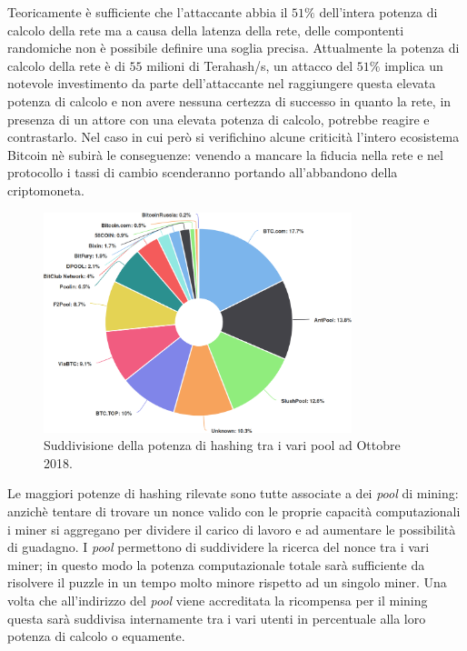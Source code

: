 Teoricamente è sufficiente che l'attaccante abbia il $51\%$ dell'intera potenza di calcolo della rete ma a causa della latenza della rete, delle compontenti randomiche non è possibile definire una soglia precisa.\newline
Attualmente la potenza di calcolo della rete è di $55$ milioni di Terahash/s, un attacco del $51\%$ implica un notevole investimento da parte dell'attaccante nel raggiungere questa elevata potenza di calcolo e non avere nessuna certezza di successo in quanto la rete, in presenza di un attore con una elevata potenza di calcolo, potrebbe reagire e contrastarlo. Nel caso in cui però si verifichino alcune criticità l'intero ecosistema Bitcoin nè subirà le conseguenze: venendo a mancare la fiducia nella rete e nel protocollo i tassi di cambio scenderanno portando all'abbandono della criptomoneta.
\begin{figure}[H]
    \centering
    \includegraphics[width=0.8\textwidth]{images/hashratedistribution.png}
    \caption{Suddivisione della potenza di hashing tra i vari pool ad Ottobre 2018.}
\end{figure}
Le maggiori potenze di hashing rilevate sono tutte associate a dei \textit{pool} di mining: anzichè tentare di trovare un nonce valido con le proprie capacità computazionali i miner si aggregano per dividere il carico di lavoro e ad aumentare le possibilità di guadagno. I \textit{pool} permettono di suddividere la ricerca del nonce tra i vari miner; in questo modo la potenza computazionale totale sarà sufficiente da risolvere il puzzle in un tempo molto minore rispetto ad un singolo miner. Una volta che all'indirizzo del \textit{pool} viene accreditata la ricompensa per il mining questa sarà suddivisa internamente tra i vari utenti in percentuale alla loro potenza di calcolo o equamente.

